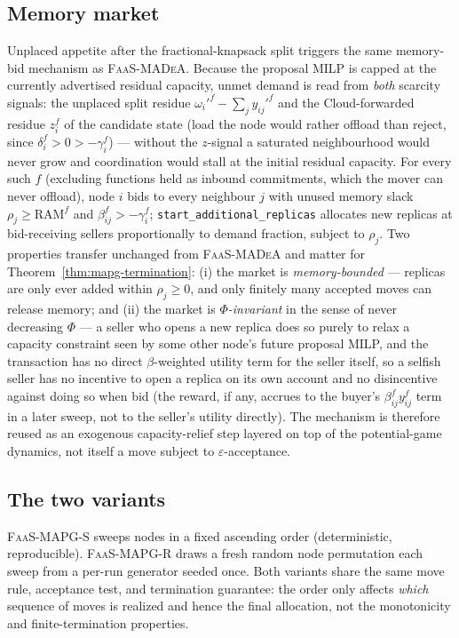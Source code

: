 \subsection{Memory market}
\label{sec:mapg-memory}

Unplaced appetite after the fractional-knapsack split triggers the same
memory-bid mechanism as \textsc{FaaS-MADeA}. Because the proposal MILP is
capped at the currently advertised residual capacity, unmet demand is read
from \emph{both} scarcity signals: the unplaced split residue
$\omega_i'^f-\sum_j y_{ij}'^f$ and the Cloud-forwarded residue $z_i^f$ of the
candidate state (load the node would rather offload than reject, since
$\delta_i^f>0>-\gamma_i^f$) — without the $z$-signal a saturated
neighbourhood would never grow and coordination would stall at the initial
residual capacity. For every such $f$ (excluding functions held as inbound
commitments, which the mover can never offload), node $i$ bids to every
neighbour $j$ with unused memory slack $\rho_j\ge\mathrm{RAM}^f$ and
$\beta_{ij}^f>-\gamma_i^f$; \texttt{start\_additional\_replicas} allocates new
replicas at bid-receiving sellers proportionally to demand fraction, subject
to $\rho_j$. Two properties transfer unchanged from \textsc{FaaS-MADeA} and
matter for Theorem~\ref{thm:mapg-termination}: (i) the market is
\emph{memory-bounded} — replicas are only ever added within $\rho_j\ge0$,
and only finitely many accepted moves can release memory; and (ii) the market is
\emph{$\Phi$-invariant} in the sense of never decreasing $\Phi$ — a seller
who opens a new replica does so purely to relax a capacity constraint seen by
some other node's future proposal MILP, and the transaction has no direct
$\beta$-weighted utility term for the seller itself, so a selfish seller has
no incentive to open a replica on its own account and no disincentive
against doing so when bid (the reward, if any, accrues to the buyer's
$\beta_{ij}^f y_{ij}^f$ term in a later sweep, not to the seller's utility
directly). The mechanism is therefore reused as an exogenous capacity-relief
step layered on top of the potential-game dynamics, not itself a move subject
to $\varepsilon$-acceptance.

\subsection{The two variants}
\label{sec:mapg-variants}

\textsc{FaaS-MAPG-S} sweeps nodes in a fixed ascending order (deterministic,
reproducible). \textsc{FaaS-MAPG-R} draws a fresh random node permutation
each sweep from a per-run generator seeded once. Both variants share the same
move rule, acceptance test, and termination guarantee: the order only affects
\emph{which} sequence of moves is realized and hence the final allocation,
not the monotonicity and finite-termination properties.

